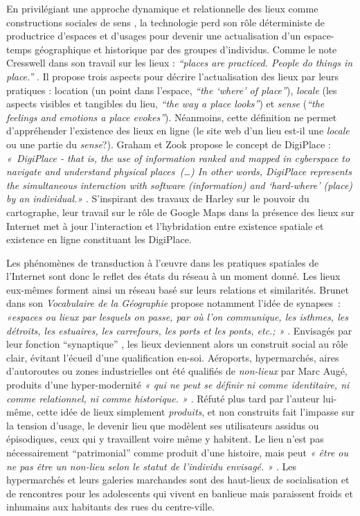 En privilégiant une approche dynamique et relationnelle des lieux comme constructions sociales de sens \citep{Kyle2007}, la technologie perd son rôle déterministe de productrice d’espaces et d’usages pour devenir une actualisation d’un espace-temps géographique et historique par des groupes d’individus. Comme le note Cresswell dans son travail sur les lieux : \textit{“places are practiced. People do things in place.”} \citep{Cresswell2004}. Il propose trois aspects pour décrire l’actualisation des lieux par leurs pratiques : location (un point dans l’espace, \textit{“the ‘where’ of place”}), \textit{locale} (les aspects visibles et tangibles du lieu, \textit{“the way a place looks”}) et \textit{sense} (\textit{“the feelings and emotions a place evokes”}). Néanmoins, cette définition ne permet d’appréhender l’existence des lieux en ligne (le site web d’un lieu est-il une \textit{locale} ou une partie du \textit{sense}?). Graham et Zook propose le concept de DigiPlace : \textit{« DigiPlace - that is, the use of information ranked and mapped in cyberspace to navigate and understand physical places (…) In other words, DigiPlace represents the simultaneous interaction with software (information) and `hard-where' (place) by an individual.»} \citep{Zook2007}. S’inspirant des travaux de Harley sur le pouvoir du cartographe, leur travail sur le rôle de Google Maps dans la présence des lieux sur Internet met à jour l’interaction et l’hybridation entre existence spatiale et existence en ligne constituant les DigiPlace. 

Les phénomènes de transduction à l’œuvre dans les pratiques spatiales de l’Internet sont donc le reflet des états du réseau à un moment donné. Les lieux eux-mêmes forment ainsi un réseau basé sur leurs relations et similarités. Brunet dans son \textit{Vocabulaire de la Géographie} propose notamment l’idée de synapses : \textit{«espaces ou lieux par lesquels on passe, par où l'on communique, les isthmes, les détroits, les estuaires, les carrefours, les ports et les ponts, etc.; »} \citep{Brunet1972}. Envisagés par leur fonction “synaptique” , les lieux deviennent alors un construit social au rôle clair, évitant l’écueil d’une qualification en-soi. Aéroports, hypermarchés, aires d’autoroutes ou zones industrielles ont été qualifiés de \textit{non-lieux} par Marc Augé, produits d’une  hyper-modernité \textit{« qui ne peut se définir ni comme identitaire, ni comme relationnel, ni comme historique. »} \citep{Auge1995}. Réfuté plus tard par l’auteur lui-même, cette idée de lieux simplement \textit{produits}, et non construits fait l’impasse sur la tension d’usage, le devenir lieu que modèlent ses utilisateurs assidus ou épisodiques, ceux qui y travaillent voire même y habitent. Le lieu n’est pas nécessairement “patrimonial” comme produit d’une histoire, mais peut \textit{« être ou ne pas être un non-lieu selon le statut de l'individu envisagé. »} \citep{Debarbieux1993}. Les hypermarchés et leurs galeries marchandes sont des haut-lieux de socialisation et de rencontres pour les adolescents qui vivent en banlieue \citep{Matthews2000} mais paraissent froids et inhumains aux habitants des rues du centre-ville.

